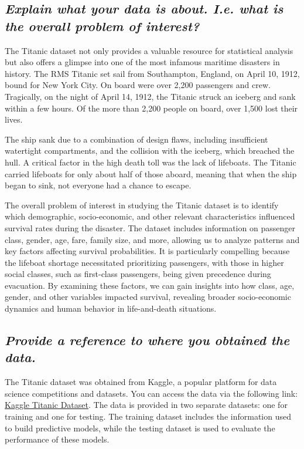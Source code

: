 \documentclass[twoside,11pt]{article}
\makeatletter
\let\@oldsubsection\subsection
\renewcommand\subsection[1]{\@oldsubsection*{\textit{#1}}}
\makeatother
\begin{document}
\subsection{Explain what your data is about. I.e. what is the overall problem of interest?}

The Titanic dataset not only provides a valuable resource for statistical analysis but also offers a glimpse into one of the most infamous maritime disasters in history. The RMS Titanic set sail from Southampton, England, on April 10, 1912, bound for New York City. On board were over 2,200 passengers and crew. Tragically, on the night of April 14, 1912, the Titanic struck an iceberg and sank within a few hours. Of the more than 2,200 people on board, over 1,500 lost their lives.

The ship sank due to a combination of design flaws, including insufficient watertight compartments, and the collision with the iceberg, which breached the hull. A critical factor in the high death toll was the lack of lifeboats. The Titanic carried lifeboats for only about half of those aboard, meaning that when the ship began to sink, not everyone had a chance to escape.

The overall problem of interest in studying the Titanic dataset is to identify which demographic, socio-economic, and other relevant characteristics influenced survival rates during the disaster. The dataset includes information on passenger class, gender, age, fare, family size, and more, allowing us to analyze patterns and key factors affecting survival probabilities. It is particularly compelling because the lifeboat shortage necessitated prioritizing passengers, with those in higher social classes, such as first-class passengers, being given precedence during evacuation. By examining these factors, we can gain insights into how class, age, gender, and other variables impacted survival, revealing broader socio-economic dynamics and human behavior in life-and-death situations.

\subsection{Provide a reference to where you obtained the data.}

The Titanic dataset was obtained from Kaggle, a popular platform for data science competitions and datasets. You can access the data via the following link: \href{https://www.kaggle.com/c/titanic/data}{Kaggle Titanic Dataset}. The data is provided in two separate datasets: one for training and one for testing. The training dataset includes the information used to build predictive models, while the testing dataset is used to evaluate the performance of these models.
\end{document}
